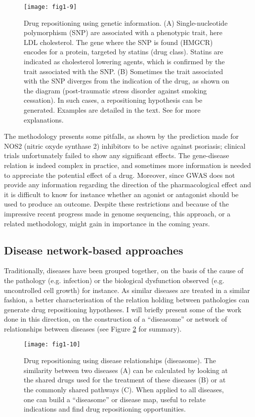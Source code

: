 \begin{figure}[ht]
    \centering
    \texttt{[image: fig1-9]}
    \caption{Drug repositioning using genetic information. (A) Single-nucleotide polymorphism (SNP) are associated with a phenotypic trait, here LDL cholesterol. The gene where the SNP is found (HMGCR) encodes for a protein, targeted by statins (drug class). Statins are indicated as cholesterol lowering agents, which is confirmed by the trait associated with the SNP. (B) Sometimes the trait associated with the SNP diverges from the indication of the drug, as shown on the diagram (post-traumatic stress disorder against smoking cessation). In such cases, a repositioning hypothesis can be generated. Examples are detailed in the text. See \cite{sanseau2012use} for more explanations.}
    \label{fig1-9}
\end{figure}

The methodology presents some pitfalls, as shown by the prediction made for NOS2 (nitric oxyde synthase 2) inhibitors to be active against psoriasis; clinical trials unfortunately failed to show any significant effects. The gene-disease relation is indeed complex in practice, and sometimes more information is needed to appreciate the potential effect of a drug. Moreover, since GWAS does not provide any information regarding the direction of the pharmacological effect and it is difficult to know for instance whether an agonist or antagonist should be used to produce an outcome. Despite these restrictions and because of the impressive recent progress made in genome sequencing, this approach, or a related methodology, might gain in importance in the coming years.

\subsection{Disease network-based approaches}

Traditionally, diseases have been grouped together, on the basis of the cause of the pathology (e.g. infection) or the biological dysfunction observed (e.g. uncontrolled cell growth) for instance. As similar diseases are treated in a similar fashion, a better characterisation of the relation holding between pathologies can generate drug repositioning hypotheses. I will briefly present some of the work done in this direction, on the construction of a ``diseasome'' or network of relationships between diseases (see Figure \ref{fig1-10} for summary).

\begin{figure}[ht]
    \centering
    \texttt{[image: fig1-10]}
    \caption{Drug repositioning using disease relationships (diseasome). The similarity between two diseases (A) can be calculated by looking at the shared drugs used for the treatment of these diseases (B) or at the commonly shared pathways (C). When applied to all diseases, one can build a ``diseasome'' or disease map, useful to relate indications and find drug repositioning opportunities.}
    \label{fig1-10}
\end{figure}

